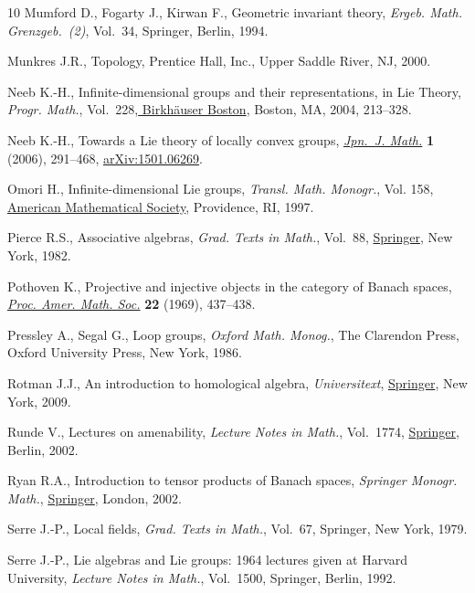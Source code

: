 \documentclass[pdftex]{sigma}
\numberwithin{equation}{section}
\begin{document}
\begin{thebibliography}{10}
Mumford D., Fogarty J., Kirwan F., Geometric invariant theory, \textit{Ergeb.
 Math. Grenzgeb.~(2)}, Vol.~34, Springer, Berlin, 1994.

Munkres J.R., Topology, Prentice Hall, Inc., Upper Saddle River, NJ, 2000.

Neeb K.-H., Infinite-dimensional groups and their representations, in Lie
 {T}heory, \textit{Progr. Math.}, Vol.~228,\href{https://doi.org/10.1007/978-0-8176-8192-0_2}{ Birkh\"auser Boston}, Boston, MA,
 2004, 213--328.

Neeb K.-H., Towards a {L}ie theory of locally convex groups, \href{https://doi.org/10.1007/s11537-006-0606-y}{\textit{Jpn.~J.
 Math.}} \textbf{1} (2006), 291--468, \href{https://arxiv.org/abs/1501.06269}{arXiv:1501.06269}.

Omori H., Infinite-dimensional {L}ie groups, \textit{Transl. Math. Monogr.},
 Vol. 158, \href{https://doi.org/10.1090/mmono/158}{American Mathematical Society}, Providence, RI, 1997.

Pierce R.S., Associative algebras, \textit{Grad. Texts in Math.}, Vol.~88,
 \href{https://doi.org/10.1007/978-1-4757-0163-0}{Springer}, New York, 1982.

Pothoven K., Projective and injective objects in the category of {B}anach
 spaces, \href{https://doi.org/10.2307/2037073}{\textit{Proc. Amer. Math. Soc.}} \textbf{22} (1969), 437--438.

Pressley A., Segal G., Loop groups, \textit{Oxford Math. Monog.}, The Clarendon Press,
 Oxford University Press, New York, 1986.

Rotman J.J., An introduction to homological algebra, \textit{Universitext}, \href{https://doi.org/10.1007/b98977}{Springer},
 New York, 2009.

Runde V., Lectures on amenability, \textit{Lecture Notes in Math.}, Vol.~1774,
 \href{https://doi.org/10.1007/b82937}{Springer}, Berlin, 2002.

Ryan R.A., Introduction to tensor products of {B}anach spaces, \textit{Springer Monogr.
 Math.}, \href{https://doi.org/10.1007/978-1-4471-3903-4}{Springer}, London, 2002.

Serre J.-P., Local fields, \textit{Grad. Texts in Math.}, Vol.~67, Springer, New
 York, 1979.

Serre J.-P., Lie algebras and {L}ie groups: 1964 lectures given at {H}arvard
 {U}niversity, \textit{Lecture Notes in Math.}, Vol.~1500, Springer, Berlin,
 1992.


\end{thebibliography}
\end{document}
